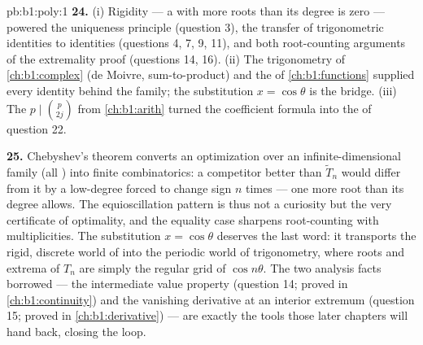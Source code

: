 \begin{solution}{pb:b1:poly:1}
\textbf{24.} (i) Rigidity --- a  with more roots than
its degree is zero --- powered the uniqueness principle
(question 3), the transfer of trigonometric identities to
 identities (questions 4, 7, 9, 11), and both
root-counting arguments of the extremality proof (questions 14,
16). (ii) The trigonometry of \cref{ch:b1:complex} (de Moivre,
sum-to-product) and the  of
\cref{ch:b1:functions} supplied every identity behind the family;
the substitution $x = \cos\theta$ is the bridge. (iii) The
 $p \mid \binom p{2j}$ from \cref{ch:b1:arith} turned
the coefficient formula into the  of question 22.

\textbf{25.} Chebyshev's theorem converts an optimization over an
infinite-dimensional family (all ) into finite
combinatorics: a competitor better than $\widetilde T_n$ would
differ from it by a low-degree  forced to change sign
$n$ times --- one more root than its degree allows. The
equioscillation pattern is thus not a curiosity but the very
certificate of optimality, and the equality case sharpens
root-counting with multiplicities. The substitution $x =
\cos\theta$ deserves the last word: it transports the rigid,
discrete world of  into the periodic world of
trigonometry, where roots and extrema of $T_n$ are simply the
regular grid of $\cos n\theta$. The two analysis facts borrowed
--- the intermediate value property (question 14; proved in
\cref{ch:b1:continuity}) and the vanishing derivative at an
interior extremum (question 15; proved in \cref{ch:b1:derivative})
--- are exactly the tools those later chapters will hand back,
closing the loop.
\end{solution}
